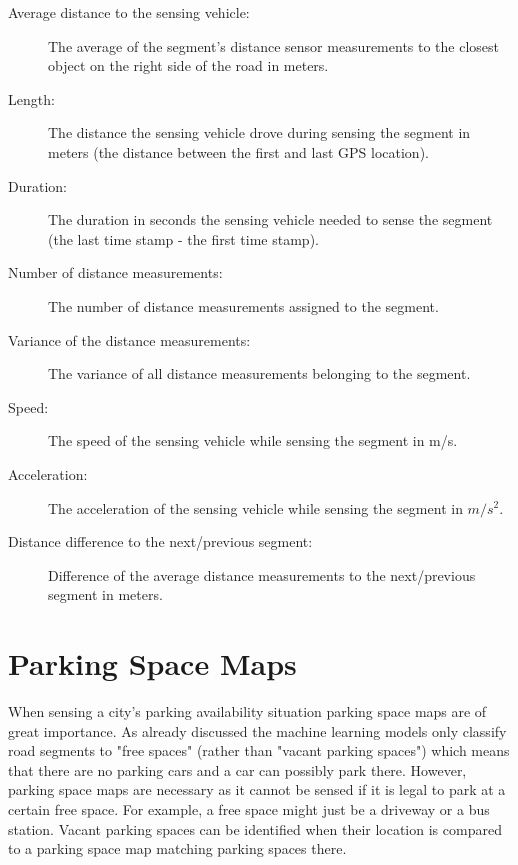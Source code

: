 \begin{description}

\item[Average distance to the sensing vehicle:] The average of the segment's distance sensor measurements to the closest object on the right side of the road in meters.

\item[Length:] The distance the sensing vehicle drove during sensing the segment in meters (the distance between the first and last GPS location).

\item[Duration:] The duration in seconds the sensing vehicle needed to sense the segment (the last time stamp - the first time stamp).

\item[Number of distance measurements:] The number of distance measurements assigned to the segment.

\item[Variance of the distance measurements:] The variance of all distance measurements belonging to the segment.

\item[Speed:] The speed of the sensing vehicle while sensing the segment in m/s.

\item[Acceleration:] The acceleration of the sensing vehicle while sensing the segment in $m/s^2$.

\item[Distance difference to the next/previous segment:] Difference of the average distance measurements to the next/previous segment in meters.

\end{description}







\section{Parking Space Maps}
\label{sec:parking_space_maps}

When sensing a city's parking availability situation parking space maps are of great importance. As already discussed the machine learning models only classify road segments to "free spaces" (rather than "vacant parking spaces") which means that there are no parking cars and a car can possibly park there. However, parking space maps are necessary as it cannot be sensed if it is legal to park at a certain free space. For example, a free space might just be a driveway or a bus station. Vacant parking spaces can be identified when their location is compared to a parking space map matching parking spaces there. 


